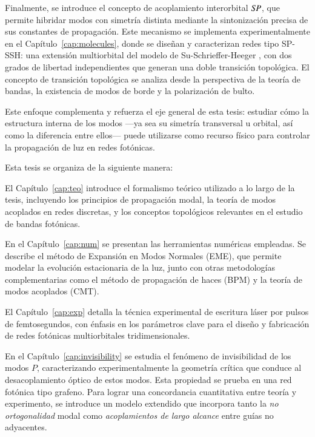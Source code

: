 Finalmente, se introduce el concepto de acoplamiento interorbital $S\hspace{-0.3ex}P$, que permite hibridar modos con simetría distinta mediante la sintonización precisa de sus constantes de propagación. Este mecanismo se implementa experimentalmente en el Capítulo~\ref{cap:molecules}, donde se diseñan y caracterizan redes tipo SP-SSH: una extensión multiorbital del modelo de Su-Schrieffer-Heeger \cite{ssh}, con dos grados de libertad independientes que generan una doble transición topológica. El concepto de transición topológica se analiza desde la perspectiva de la teoría de bandas, la existencia de modos de borde y la polarización de bulto.

Este enfoque complementa y refuerza el eje general de esta tesis: estudiar cómo la estructura interna de los modos —ya sea su simetría transversal u orbital, así como la diferencia entre ellos— puede utilizarse como recurso físico para controlar la propagación de luz en redes fotónicas.

\vspace{1em}

Esta tesis se organiza de la siguiente manera:

El Capítulo~\ref{cap:teo} introduce el formalismo teórico utilizado a lo largo de la tesis, incluyendo los principios de propagación modal, la teoría de modos acoplados en redes discretas, y los conceptos topológicos relevantes en el estudio de bandas fotónicas.

En el Capítulo~\ref{cap:num} se presentan las herramientas numéricas empleadas. Se describe el método de Expansión en Modos Normales (EME), que permite modelar la evolución estacionaria de la luz, junto con otras metodologías complementarias como el método de propagación de haces (BPM) y la teoría de modos acoplados (CMT).

El Capítulo~\ref{cap:exp} detalla la técnica experimental de escritura láser por pulsos de femtosegundos, con énfasis en los parámetros clave para el diseño y fabricación de redes fotónicas multiorbitales tridimensionales.

En el Capítulo~\ref{cap:invisibility} se estudia el fenómeno de invisibilidad de los modos \( P \), caracterizando experimentalmente la geometría crítica que conduce al desacoplamiento óptico de estos modos. Esta propiedad se prueba en una red fotónica tipo grafeno. Para lograr una concordancia cuantitativa entre teoría y experimento, se introduce un modelo extendido que incorpora tanto la \textit{no ortogonalidad} modal como \textit{acoplamientos de largo alcance} entre guías no adyacentes.

